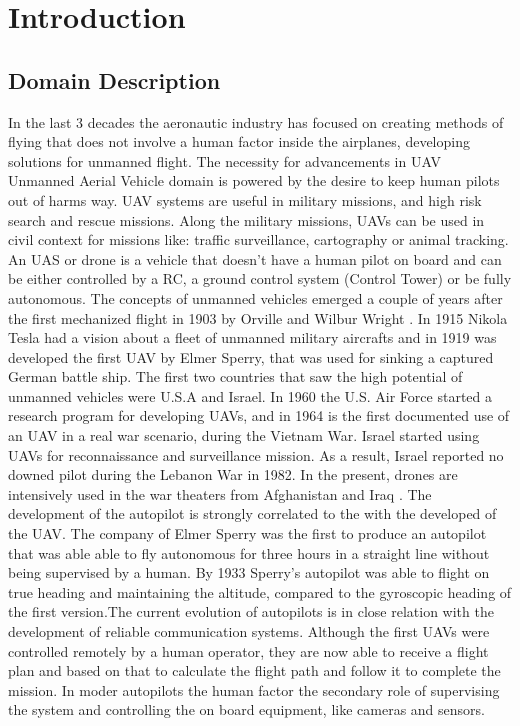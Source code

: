 \chapter{Introduction}
\label{chapter:intro}
\section{Domain Description}
\label{sec:domain}
In the last 3 decades the aeronautic industry has focused on creating methods 
of flying that does not involve a human factor inside the airplanes, developing
solutions for unmanned flight. The necessity for advancements in UAV
{Unmanned Aerial Vehicle} domain is powered by the desire to keep human pilots 
out of harms way. UAV systems are useful in military missions, and high risk 
search and rescue missions. Along the military missions, UAVs can be used in 
civil context for missions like: traffic surveillance, cartography or animal 
tracking. An UAS or drone is a vehicle that doesn't have
a human pilot on board and can be either controlled by a RC, 
a ground control system (Control Tower) or be fully autonomous. The concepts of 
unmanned vehicles emerged a couple of years after the first mechanized flight
in 1903 by Orville and Wilbur Wright \cite{learning-to-fly}. In 1915 Nikola
Tesla had a vision about a fleet of unmanned military aircrafts and in 1919 was
developed the first UAV by Elmer Sperry,  that was used for sinking a captured
German battle ship. The first two countries that saw the high potential of unmanned vehicles were
U.S.A and Israel. In 1960 the U.S. Air Force started a research program for
developing UAVs,  and in 1964 is the first documented use of an UAV in a real
war scenario,  during the Vietnam War. Israel started using UAVs for 
reconnaissance and surveillance mission. As a result, Israel reported no downed 
pilot during the Lebanon War in 1982. In the present,  drones are intensively 
used in the war theaters from Afghanistan and Iraq \cite{eyes-of-the-army}.
The development of the autopilot is strongly correlated to the with the 
developed of the UAV. The company of Elmer Sperry was the first to produce
an autopilot that was able able to fly autonomous for three hours in a straight
line without being supervised by a human. By 1933 Sperry's autopilot was able to
flight on true heading and maintaining the altitude,  compared to the gyroscopic
heading of the first version.The current evolution of autopilots is in close relation with the development
of reliable communication systems. Although the first UAVs were controlled
remotely by a human operator,  they are now able to receive a flight plan
and based on that to calculate the flight path and follow it to complete the 
mission. In moder autopilots the human factor the secondary role of supervising
the system and controlling the on board equipment, like cameras and sensors. 

